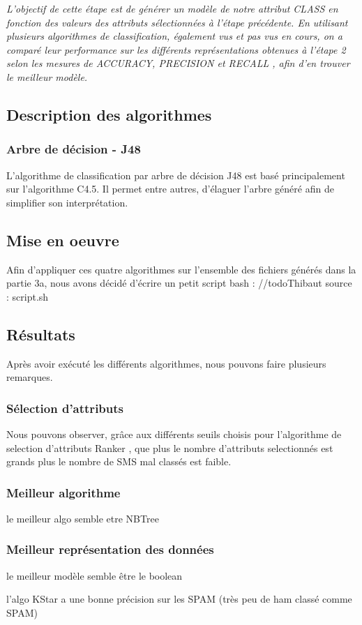 \textit{L’objectif de cette étape est de générer un modèle de notre attribut CLASS en fonction des valeurs des attributs sélectionnées à l’étape précédente. En utilisant plusieurs algorithmes de classification, également vus et pas vus en cours, on a comparé leur performance sur les différents représentations obtenues à l’étape 2 selon les mesures de \og ACCURACY, PRECISION et RECALL \fg{} , afin d’en trouver le meilleur modèle.}

\subsection{Description des algorithmes}
\subsubsection {Arbre de décision - J48}
L'algorithme de classification par arbre de décision J48 est basé principalement sur l'algorithme C4.5. Il permet entre autres, d'élaguer l'arbre généré afin de simplifier son interprétation.  

\subsection{Mise en oeuvre}

Afin d'appliquer ces quatre algorithmes sur l'ensemble des fichiers générés dans la partie 3a, nous avons décidé d'écrire un petit script bash :
//todo{Thibaut} source : script.sh

\subsection{Résultats}

Après avoir exécuté les différents algorithmes, nous pouvons faire plusieurs remarques.

\subsubsection{Sélection d'attributs}
Nous pouvons observer, grâce aux différents seuils choisis pour l'algorithme de selection d'attributs \og Ranker \fg{}, que plus le nombre d'attributs selectionnés est grands plus le nombre de SMS mal classés est faible.

\subsubsection{Meilleur algorithme}
    le meilleur algo semble etre NBTree

\subsubsection{Meilleur représentation des données}
    le meilleur modèle semble être le boolean 

    l'algo KStar a une bonne précision sur les SPAM (très peu de ham classé comme SPAM)



